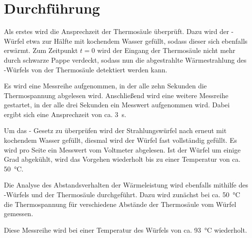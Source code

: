 
\section{Durchführung}

Als erstes wird die Ansprechzeit der Thermosäule überprüft. Dazu wird
der -Würfel etwa zur Hälfte mit kochendem Wasser gefüllt,
sodass dieser sich ebenfalls erwärmt. Zum Zeitpunkt $t = 0$ wird der Eingang
der Thermosäule nicht mehr durch schwarze Pappe verdeckt, sodass nun die
abgestrahlte Wärmestrahlung des -Würfels von der
Thermosäule detektiert werden kann.

Es wird eine Messreihe aufgenommen, in der alle zehn Sekunden die
Thermospannung abgelesen wird.  Anschließend wird eine weitere Messreihe
gestartet, in der alle drei Sekunden ein Messwert aufgenommen wird.
Dabei ergibt sich eine Ansprechzeit von ca. \SI{3}{\second}.


Um das - Gesetz zu überprüfen wird der
Strahlungswürfel nach  erneut mit kochendem Wasser gefüllt,
diesmal wird der Würfel fast vollständig gefüllt.  Es wird pro Seite ein
Messwert vom Voltmeter abgelesen. Ist der Würfel um einige Grad
abgekühlt, wird das Vorgehen wiederholt bis zu einer Temperatur von ca.
\SI{50}{\celsius}.

Die Analyse des Abstandsverhalten der Wärmeleistung wird ebenfalls
mithilfe des -Würfels und der Thermosäule durchgeführt.
Dazu wird zunächst bei ca. \SI{50}{\celsius} die Thermospannung für
verschiedene Abstände der Thermosäule vom Würfel gemessen.

Diese Messreihe wird bei einer Temperatur des Würfels von ca.
\SI{93}{\celsius} wiederholt.
